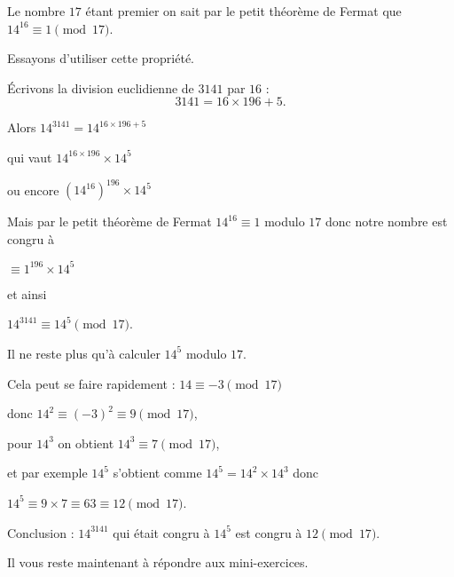 \change


Le nombre $17$ étant premier on sait par le petit théorème de Fermat que
$14^{16} \equiv 1 \pmod {17}$.

\change

Essayons d'utiliser cette propriété.

\'Ecrivons la division euclidienne de $3141$ par $16$ :
$$3141 = 16\times 196 + 5.$$

\change

Alors
$14^{3141} = 14^{16 \times 196 + 5}$

\change

qui vaut $14^{16\times 196}\times 14^5$

\change

ou encore 
$ \left(14^{16}\right)^{196}\times 14^5$

\change

Mais par le petit théorème de Fermat 
$14^{16} \equiv 1$  modulo $17$ donc notre nombre est congru à

$ \equiv 1^{196} \times 14^5$

et ainsi 

$14^{3141} \equiv  14^5\pmod{17}$.

\change

Il ne reste plus qu'à calculer $14^5$ modulo $17$.

\change


Cela peut se faire rapidement :
$14 \equiv -3 \pmod {17}$ 


\change

donc $14^2\equiv (-3)^2 \equiv 9 \pmod {17}$,

\change

pour $14^3$ on obtient $14^3 \equiv 7 \pmod{17}$,

\change

et par exemple $14^5$ s'obtient comme $14^5 = 14^2 \times 14^3$ donc

$14^5 \equiv 9 \times 7 \equiv 63 \equiv 12 \pmod {17}$.

\change

Conclusion : $14^{3141}$ qui était congru à $14^5$ est congru à $12 \pmod {17}$.




\diapo


Il vous reste maintenant à répondre aux mini-exercices.


